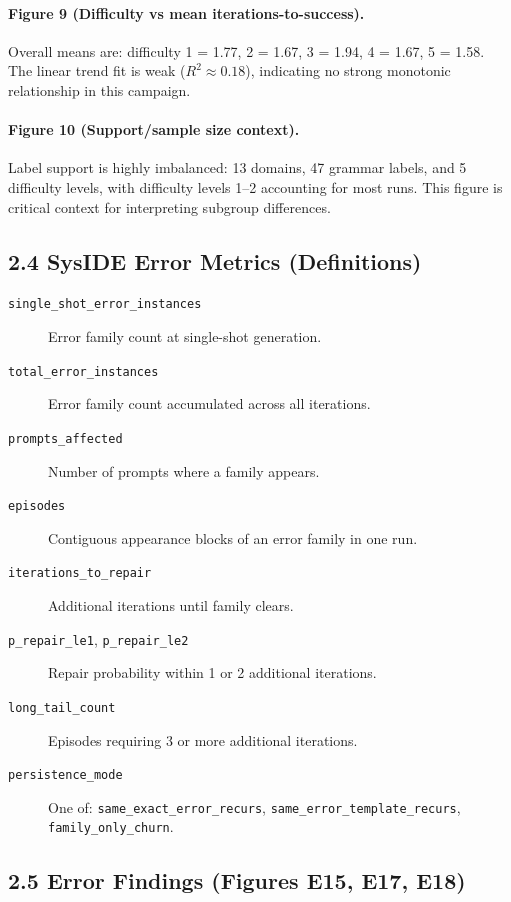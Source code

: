 \documentclass[11pt]{article}
\begin{document}
\paragraph{Figure 9 (Difficulty vs mean iterations-to-success).}
Overall means are: difficulty 1 = 1.77, 2 = 1.67, 3 = 1.94, 4 = 1.67, 5 = 1.58. The linear trend fit is weak (\(R^2 \approx 0.18\)), indicating no strong monotonic relationship in this campaign.

\paragraph{Figure 10 (Support/sample size context).}
Label support is highly imbalanced: 13 domains, 47 grammar labels, and 5 difficulty levels, with difficulty levels 1--2 accounting for most runs. This figure is critical context for interpreting subgroup differences.

\subsection*{2.4 SysIDE Error Metrics (Definitions)}
\begin{description}
    \item[\texttt{single\_shot\_error\_instances}] Error family count at single-shot generation.
    \item[\texttt{total\_error\_instances}] Error family count accumulated across all iterations.
    \item[\texttt{prompts\_affected}] Number of prompts where a family appears.
    \item[\texttt{episodes}] Contiguous appearance blocks of an error family in one run.
    \item[\texttt{iterations\_to\_repair}] Additional iterations until family clears.
    \item[\texttt{p\_repair\_le1}, \texttt{p\_repair\_le2}] Repair probability within 1 or 2 additional iterations.
    \item[\texttt{long\_tail\_count}] Episodes requiring 3 or more additional iterations.
    \item[\texttt{persistence\_mode}] One of: \texttt{same\_exact\_error\_recurs}, \texttt{same\_error\_template\_recurs}, \texttt{family\_only\_churn}.
\end{description}

\subsection*{2.5 Error Findings (Figures E15, E17, E18)}
\end{document}
